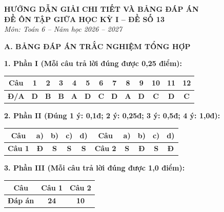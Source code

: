 \documentclass[12pt,a4paper]{article}
\begin{document}
\begin{center}
  \textbf{\Large HƯỚNG DẪN GIẢI CHI TIẾT VÀ BẢNG ĐÁP ÁN}\\
  \textbf{\large ĐỀ ÔN TẬP GIỮA HỌC KỲ I -- ĐỀ SỐ 13}\\
  \textit{Môn: Toán 6 -- Năm học 2026 -- 2027}
\end{center}
\vspace{2mm}

\noindent\textbf{\large A. BẢNG ĐÁP ÁN TRẮC NGHIỆM TỔNG HỢP}
\vspace{1.5mm}

\noindent\textbf{1. Phần I (Mỗi câu trả lời đúng được 0,25 điểm):}
\begin{center}
\begin{tabular}{|c|c|c|c|c|c|c|c|c|c|c|c|c|}
\hline
\textbf{Câu} & \textbf{1} & \textbf{2} & \textbf{3} & \textbf{4} & \textbf{5} & \textbf{6} & \textbf{7} & \textbf{8} & \textbf{9} & \textbf{10} & \textbf{11} & \textbf{12} \\
\hline
\textbf{Đ/A} & \textbf{D} & \textbf{B} & \textbf{B} & \textbf{A} & \textbf{D} & \textbf{C} & \textbf{D} & \textbf{A} & \textbf{D} & \textbf{C} & \textbf{D} & \textbf{C} \\
\hline
\end{tabular}
\end{center}
\vspace{1mm}

\noindent\textbf{2. Phần II (Đúng 1 ý: 0,1đ; 2 ý: 0,25đ; 3 ý: 0,5đ; 4 ý: 1,0đ):}
\begin{center}
\begin{tabular}{|c|c|c|c|c||c|c|c|c|c|}
\hline
\textbf{Câu} & \textbf{a)} & \textbf{b)} & \textbf{c)} & \textbf{d)} & \textbf{Câu} & \textbf{a)} & \textbf{b)} & \textbf{c)} & \textbf{d)} \\
\hline
\textbf{Câu 1} & \textbf{Đ} & \textbf{S} & \textbf{S} & \textbf{S} & \textbf{Câu 2} & \textbf{S} & \textbf{Đ} & \textbf{S} & \textbf{Đ} \\
\hline
\end{tabular}
\end{center}
\vspace{1mm}

\noindent\textbf{3. Phần III (Mỗi câu trả lời đúng được 1,0 điểm):}
\begin{center}
\begin{tabular}{|c|c|c|}
\hline
\textbf{Câu} & \textbf{Câu 1} & \textbf{Câu 2} \\
\hline
\textbf{Đáp án} & \textbf{24} & \textbf{10} \\
\hline
\end{tabular}
\end{center}
\vspace{3mm}
\end{document}
